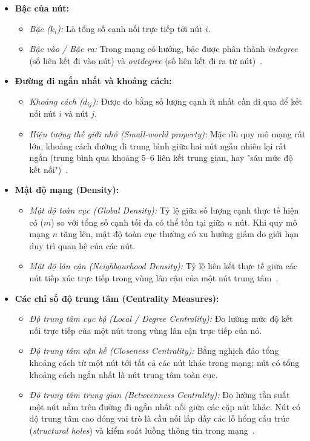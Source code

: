 \documentclass[14pt,a4paper]{extarticle}
\begin{document}
\begin{itemize}
    \item \textbf{Bậc của nút:}
    \begin{itemize}
        \item \textit{Bậc ($k_i$):} Là tổng số cạnh nối trực tiếp tới nút $i$.
        \item \textit{Bậc vào / Bậc ra:} Trong mạng có hướng, bậc được phân thành \textit{indegree} (số liên kết đi vào nút) và \textit{outdegree} (số liên kết đi ra từ nút)~\cite{Scott2012}.
    \end{itemize}

    \item \textbf{Đường đi ngắn nhất và khoảng cách:}
    \begin{itemize}
        \item \textit{Khoảng cách ($d_{ij}$):} Được đo bằng số lượng cạnh ít nhất cần đi qua để kết nối nút $i$ và nút $j$.
        \item \textit{Hiện tượng thế giới nhỏ (Small-world property):} Mặc dù quy mô mạng rất lớn, khoảng cách đường đi trung bình giữa hai nút ngẫu nhiên lại rất ngắn (trung bình qua khoảng 5--6 liên kết trung gian, hay "sáu mức độ kết nối")~\cite{Scott2012}.
    \end{itemize}

    \item \textbf{Mật độ mạng (Density):}
    \begin{itemize}
        \item \textit{Mật độ toàn cục (Global Density):} Tỷ lệ giữa số lượng cạnh thực tế hiện có ($m$) so với tổng số cạnh tối đa có thể tồn tại giữa $n$ nút. Khi quy mô mạng $n$ tăng lên, mật độ toàn cục thường có xu hướng giảm do giới hạn duy trì quan hệ của các nút.
        \item \textit{Mật độ lân cận (Neighbourhood Density):} Tỷ lệ liên kết thực tế giữa các nút tiếp xúc trực tiếp trong vùng lân cận của một nút trung tâm~\cite{Scott2012}.
    \end{itemize}

    \item \textbf{Các chỉ số độ trung tâm (Centrality Measures):}
    \begin{itemize}
        \item \textit{Độ trung tâm cục bộ (Local / Degree Centrality):} Đo lường mức độ kết nối trực tiếp của một nút trong vùng lân cận trực tiếp của nó.
        \item \textit{Độ trung tâm cận kề (Closeness Centrality):} Bằng nghịch đảo tổng khoảng cách từ một nút tới tất cả các nút khác trong mạng; nút có tổng khoảng cách ngắn nhất là nút trung tâm toàn cục.
        \item \textit{Độ trung tâm trung gian (Betweenness Centrality):} Đo lường tần suất một nút nằm trên đường đi ngắn nhất nối giữa các cặp nút khác. Nút có độ trung tâm cao đóng vai trò là cầu nối lấp đầy các lỗ hổng cấu trúc (\textit{structural holes}) và kiểm soát luồng thông tin trong mạng~\cite{Scott2012}.
    \end{itemize}


\end{itemize}
\end{document}
